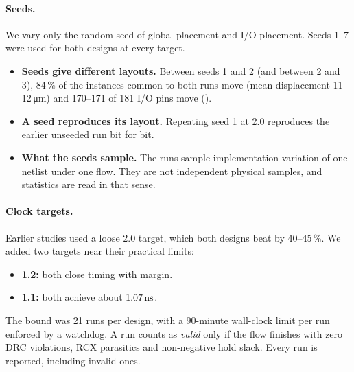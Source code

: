 \paragraph{Seeds.} We vary only the random seed of global placement and I/O placement. Seeds 1--7 were used for both designs at every target.
\begin{itemize}
  \item \textbf{Seeds give different layouts.} Between seeds 1 and 2 (and between 2 and 3), 84\,\% of the instances common to both runs move (mean displacement 11--12\,\si{\micro\meter}) and 170--171 of 181 I/O pins move ().
  \item \textbf{A seed reproduces its layout.} Repeating seed 1 at 2.0\ns{} reproduces the earlier unseeded run bit for bit.
  \item \textbf{What the seeds sample.} The runs sample implementation variation of one netlist under one flow. They are not independent physical samples, and statistics are read in that sense.
\end{itemize}

\paragraph{Clock targets.} Earlier studies used a loose 2.0\ns{} target, which both designs beat by 40--45\,\%. We added two targets near their practical limits:
\begin{itemize}
  \item \textbf{1.2\ns:} both close timing with margin.
  \item \textbf{1.1\ns:} both achieve about $1.07\,\si{\nano\second}$.
\end{itemize}
The bound was 21 runs per design, with a 90-minute wall-clock limit per run enforced by a watchdog. A run counts as \emph{valid} only if the flow finishes with zero DRC violations, RCX parasitics and non-negative hold slack. Every run is reported, including invalid ones.


